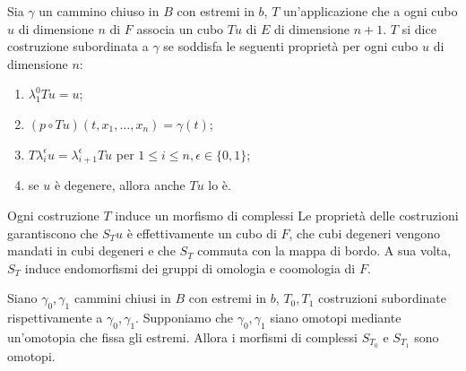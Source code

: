 \begin{definition}
Sia $\gamma$ un cammino chiuso in $B$ con estremi in $b$, $T$ un'applicazione che a ogni cubo $u$ di dimensione $n$ di $F$ associa un cubo $Tu$ di $E$ di dimensione $n+1$. $T$ si dice costruzione subordinata a $\gamma$ se soddisfa le seguenti proprietà per ogni cubo $u$ di dimensione $n$:
\begin{enumerate}
\item $\lambda^0_1 Tu=u$;
\item $(p\circ Tu)(t,x_1,\ldots,x_n)=\gamma(t)$;
\item $T\lambda^\epsilon_iu=\lambda^\epsilon_{i+1}Tu$ per $1\le i\le n,\epsilon\in\{0,1\}$;
\item se $u$ è degenere, allora anche $Tu$ lo è.
\end{enumerate}
\end{definition}
Ogni costruzione $T$ induce un morfismo di complessi
Le proprietà delle costruzioni garantiscono che $S_Tu$ è effettivamente un cubo di $F$, che cubi degeneri vengono mandati in cubi degeneri e che $S_T$ commuta con la mappa di bordo. A sua volta, $S_T$ induce endomorfismi dei gruppi di omologia e coomologia di $F$.
\begin{proposition}
Siano $\gamma_0,\gamma_1$ cammini chiusi in $B$ con estremi in $b$, $T_0,T_1$ costruzioni subordinate rispettivamente a $\gamma_0,\gamma_1$. Supponiamo che $\gamma_0,\gamma_1$ siano omotopi mediante un'omotopia che fissa gli estremi. Allora i morfismi di complessi $S_{T_0}$ e $S_{T_1}$ sono omotopi.
\end{proposition}
